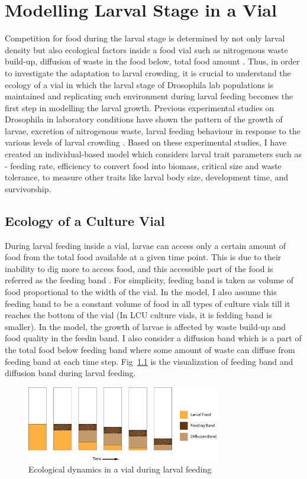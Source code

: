 \chapter{Modelling Larval Stage in a Vial}
Competition for food during the larval stage is determined by not only larval density but also ecological factors inside a food vial such as nitrogenous waste build-up, diffusion of waste in the food below, total food amount \citep{sarangiEcologicalDetailsMediate2018}. Thus, in order to investigate the adaptation to larval crowding, it is crucial to understand the ecology of a vial in which the larval stage of Drosophila lab populations is maintained and replicating such environment during larval feeding becomes the first step in modelling the larval growth. Previous experimental studies on Drosophila in laboratory conditions have shown the pattern of the growth of larvae, excretion of nitrogenous waste, larval feeding behaviour in response to the various levels of larval crowding \citep{sarangiEcologicalDetailsMediate2018}. Based on these experimental studies, I have created an individual-based model which considers larval trait parameters such as - feeding rate, efficiency to convert food into biomass, critical size and waste tolerance, to measure other traits like larval body size, development time, and survivorship.
\section{Ecology of a Culture Vial}
During larval feeding inside a vial, larvae can access only a certain amount of food from the total food available at a given time point. This is due to their inability to dig more to access food, and this accessible part of the food is referred as the feeding band \citep{godoy-herreraInterIntrapopulationalVariation1977,sarangiEcologicalDetailsMediate2018}. For simplicity, feeding band is taken as volume of food proportional to the width of the vial. In the model, I also assume this feeding band to be a constant volume of food in all types of culture vials till it reaches the bottom of the vial (In LCU culture vials, it is fedding band is smaller). In the model, the growth of larvae is affected by waste build-up and food quality in the feedin band. I also consider a diffusion band which is a part of the total food below feeding band where some amount of waste can diffuse from feeding band at each time step. Fig~\ref{fig:vial} is the visualization of feeding band and diffusion band during larval feeding.

\begin{figure}[h]
  \centering
  \includegraphics[width=0.75\textwidth]{C2/Figs/vial_diagram.png}
  \caption{Ecological dynamics in a vial during larval feeding}
  \label{fig:vial}
\end{figure}

